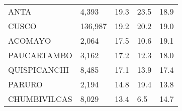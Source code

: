 \begin{tabular}{lllll}
	\cellcolor[HTML]{FF5050}ANTA                                   & 4,393                                                                 & 19.3                                                                             & 23.5                                                                        & 18.9                                                                                \\
	\cellcolor[HTML]{FF5050}CUSCO                                  & 136,987                                                               & 19.2                                                                             & 20.2                                                                        & 19.0                                                                                \\
	\cellcolor[HTML]{FF5050}ACOMAYO                                & 2,064                                                                 & 17.5                                                                             & 10.6                                                                        & 19.1                                                                                \\
	\cellcolor[HTML]{FF5050}PAUCARTAMBO                            & 3,162                                                                 & 17.2                                                                             & 12.3                                                                        & 18.0                                                                                \\
	\cellcolor[HTML]{FF5050}QUISPICANCHI                           & 8,485                                                                 & 17.1                                                                             & 13.9                                                                        & 17.4                                                                                \\
	\cellcolor[HTML]{FF5050}PARURO                                 & 2,194                                                                 & 14.8                                                                             & 19.4                                                                        & 13.8                                                                                \\
	\cellcolor[HTML]{FF5050}CHUMBIVILCAS                           & 8,029                                                                 & 13.4                                                                             & 6.5                                                                         & 14.7                                                                                \\

\end{tabular}

